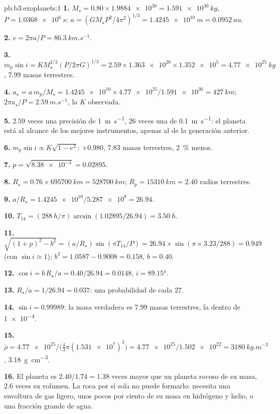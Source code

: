 \begin{solution}{pb:b3:exoplanets:1}
\textbf{1.} $M_\star = 0.80\times\num{1.9884e30} = \qty{1.591e30}{kg}$, $P =
\qty{1.0368e6}{s}$: $a = (GM_\star P^2/4\pi^2)^{1/3} = \qty{1.4245e10}{m}
= \qty{0.0952}{au}$.

\textbf{2.} $v = 2\pi a/P = \qty{86.3}{km.s^{-1}}$.

\textbf{3.} $m_p\sin i = KM_\star^{2/3}(P/2\pi G)^{1/3} = 2.59\times\num{1.363e20}
\times\num{1.352e5} = \qty{4.77e25}{kg}$, \num{7.99} masas terrestres.

\textbf{4.} $a_\star = a\,m_p/M_\star = \num{1.4245e10}\times\num{4.77e25}/
\num{1.591e30} = \qty{427}{km}$; $2\pi a_\star/P = \qty{2.59}{m.s^{-1}}$,
la $K$ observada.

\textbf{5.} $2.59$ veces una precisión de \qty{1}{m.s^{-1}}, 26 veces una de
\qty{0.1}{m.s^{-1}}: el planeta está al alcance de los mejores instrumentos,
apenas al de la generación anterior.

\textbf{6.} $m_p\sin i \propto K\sqrt{1 - e^2}$: $\times0.980$, 7.83
masas terrestres, \qty{2}{\percent} menos.

\textbf{7.} $p = \sqrt{\num{8.38e-4}} = 0.02895$.

\textbf{8.} $R_\star = 0.76\times\qty{695700}{km} = \qty{528700}{km}$; $R_p =
\qty{15310}{km} = 2.40$ radios terrestres.

\textbf{9.} $a/R_\star = \num{1.4245e10}/\num{5.287e8} = 26.94$.

\textbf{10.} $T_{14} = (\qty{288}{h}/\pi)\arcsin(1.02895/26.94) = \qty{3.50}{h}$.

\textbf{11.} $\sqrt{(1 + p)^2 - b^2} = (a/R_\star)\sin(\pi T_{14}/P) = 26.94\times
\sin(\pi\times3.23/288) = 0.949$ (con $\sin i \approx 1$); $b^2 =
1.0587 - 0.9008 = 0.158$, $b = 0.40$.

\textbf{12.} $\cos i = b\,R_\star/a = 0.40/26.94 = 0.0148$, $i = \ang{89.15}$.

\textbf{13.} $R_\star/a = 1/26.94 = 0.037$: una probabilidad de cada 27.

\textbf{14.} $\sin i = 0.99989$: la masa verdadera es 7.99 masas terrestres, la 
dentro de \num{1e-4}.

\textbf{15.} $\bar\rho = \num{4.77e25}/\bigl(\tfrac43\pi(\num{1.531e7})^3\bigr) =
\num{4.77e25}/\num{1.502e22} = \qty{3180}{kg.m^{-3}}$,
\qty{3.18}{g.cm^{-3}}.

\textbf{16.} El planeta es $2.40/1.74 = 1.38$ veces mayor que un planeta rocoso de
su masa, 2.6 veces su volumen. La roca por sí sola no puede formarlo: necesita una
envoltura de gas ligero, unos pocos por ciento de su masa en hidrógeno y helio,
o una fracción grande de agua.


\end{solution}
